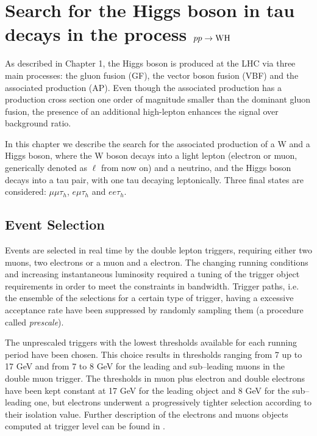 \chapter[$pp\rightarrow\W\rm{H}$]{Search for the Higgs boson in tau decays in the process $pp\rightarrow\W\rm{H}$}%

As described in Chapter 1, the Higgs boson is produced at the LHC via three main processes: the gluon fusion (GF), the vector boson fusion (VBF) and the associated production (AP). Even though the associated production has a production cross section one order of magnitude smaller than the dominant gluon fusion, the presence of an additional high-\pT lepton enhances the signal over background ratio. 

In this chapter we describe the search for the associated production of a W and a Higgs boson, where the W boson decays into a light lepton (electron or muon, generically denoted as $\ell$ from now on) and a neutrino, and the Higgs boson decays into a tau pair, with one tau decaying leptonically. Three final states are considered: $\mu\mu\tau_h$, $e\mu\tau_h$ and $ee\tau_h$. 

\section{Event Selection}

Events are selected in real time by the double lepton triggers, requiring either two muons, two electrons or a muon and a electron. The changing running conditions and increasing instantaneous luminosity required a tuning of the trigger object requirements in order to meet the constraints in bandwidth. Trigger paths, i.e. the ensemble of the selections for a certain type of trigger, having a excessive acceptance rate have been suppressed by randomly sampling them (a procedure called \emph{prescale}).

The unprescaled triggers with the lowest \pT thresholds available for each running period have been chosen. This choice results in \pT thresholds ranging from 7 up to 17 GeV and from 7 to 8 GeV for the leading and sub--leading muons in the double muon trigger. The \pT thresholds in muon plus electron and double electrons have been kept constant at 17 GeV for the leading object and 8 GeV for the sub--leading one, but electrons underwent a progressively tighter selection according to their isolation value. Further description of the electrons and muons objects computed at trigger level can be found in \cite{Chatrchyan:2012xi,CMS-PAS-EGM-10-004}.

